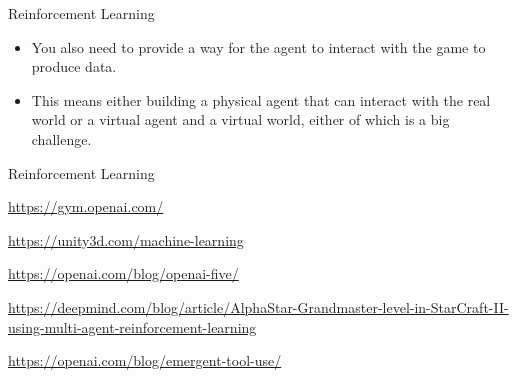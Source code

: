 \documentclass{beamer}
\begin{document}




\begin{frame}{Reinforcement Learning}

\begin{itemize} 
\item You also need to provide a way for the agent to interact with the game to produce data.

\item This means either building a physical agent that can interact with the real world or a virtual agent and a virtual world, either of which is a big challenge. 

\end{itemize}

\end{frame}


\begin{frame}{Reinforcement Learning}

\url{https://gym.openai.com/}

\url{https://unity3d.com/machine-learning}

\url{https://openai.com/blog/openai-five/}

{\tiny
\url{https://deepmind.com/blog/article/AlphaStar-Grandmaster-level-in-StarCraft-II-using-multi-agent-reinforcement-learning}
}

\url{https://openai.com/blog/emergent-tool-use/}

\end{frame}
\end{document}
